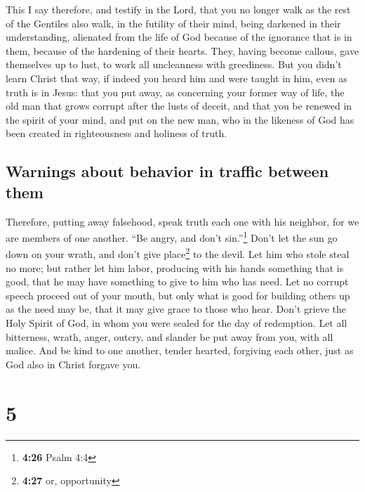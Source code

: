 This I say therefore, and testify in the Lord, that you
no longer walk as the rest of the Gentiles also walk, in the futility of
their mind,  being darkened in their understanding,
alienated from the life of God because of the ignorance that is in them,
because of the hardening of their hearts.  They, having
become callous, gave themselves up to lust, to work all uncleanness with
greediness.  But you didn't learn Christ that way,
 if indeed you heard him and were taught in him, even as
truth is in Jesus:  that you put away, as concerning your
former way of life, the old man that grows corrupt after the lusts of
deceit,  and that you be renewed in the spirit of your
mind,  and put on the new man, who in the likeness of God
has been created in righteousness and holiness of truth.

\hypertarget{warnings-about-behavior-in-traffic-between-them}{%
\subsection{Warnings about behavior in traffic between
them}\label{warnings-about-behavior-in-traffic-between-them}}

 Therefore, putting away falsehood, speak truth each one
with his neighbor, for we are members of one another. 
``Be angry, and don't sin.''\footnote{\textbf{4:26} Psalm 4:4} Don't let
the sun go down on your wrath,  and don't give
place\footnote{\textbf{4:27} or, opportunity} to the devil.
 Let him who stole steal no more; but rather let him
labor, producing with his hands something that is good, that he may have
something to give to him who has need.  Let no corrupt
speech proceed out of your mouth, but only what is good for building
others up as the need may be, that it may give grace to those who hear.
 Don't grieve the Holy Spirit of God, in whom you were
sealed for the day of redemption.  Let all bitterness,
wrath, anger, outcry, and slander be put away from you, with all malice.
 And be kind to one another, tender hearted, forgiving
each other, just as God also in Christ forgave you.

\hypertarget{section-4}{%
\section{5}\label{section-4}}

